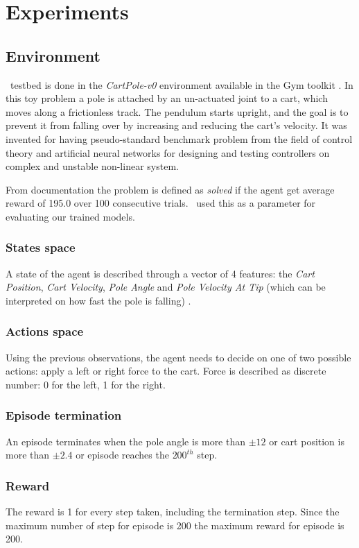 \section{Experiments}

\subsection{Environment}
\Authpp~testbed is done in the \textit{CartPole-v0} environment available in the Gym toolkit \cite{Gym}.
In this toy problem a pole is attached by an un-actuated joint to a cart, which moves along a frictionless track. The pendulum starts upright, and the goal is to prevent it from falling over by increasing and reducing the cart's velocity. It was invented for having pseudo-standard benchmark problem from the field of control theory and artificial neural networks for designing and testing controllers on complex and unstable non-linear system.

From documentation the problem is defined as \textit{solved} if the agent get average reward of 195.0 over 100 consecutive trials. \Auth~used this as a parameter for evaluating our trained models.
 
\subsubsection{States space}
A state of the agent is described through a vector of 4 features: the  \textit{Cart Position}, \textit{Cart Velocity}, \textit{Pole Angle} and \textit{Pole Velocity At Tip} (which can be interpreted on how fast the pole is falling) .

\subsubsection{Actions space}
Using the previous observations, the agent needs to decide on one of two possible actions: apply a left or right force to the cart. Force is described as discrete number: 0 for the left, 1 for the right.

\subsubsection{Episode termination}
An episode terminates when the pole angle is more than $\pm12$ or cart position is more than $\pm2.4$ or episode reaches the $200^{th}$ step.

\subsubsection{Reward}
The reward is 1 for every step taken, including the termination step. Since the maximum number of step for episode is 200 the maximum reward for episode is 200.


